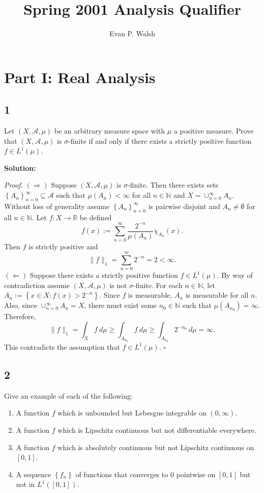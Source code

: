 \documentclass[12pt]{article}
\title{Spring 2001 Analysis Qualifier}
\author{Evan P. Walsh}
\newcounter{ProofCounter}
\newenvironment{Proof}{\stepcounter{ProofCounter}\textit{Proof.}}{\hfill$\square$}
\begin{document}

\section*{Part I: Real Analysis}

\subsection*{1}
Let $(X, \mathcal{A}, \mu)$ be an arbitrary measure space with $\mu$ a positive measure. Prove that $(X, \mathcal{A}, \mu)$ is $\sigma$-finite if and
only if there exists a strictly positive function $f \in L^{1}(\mu)$.

{\bf Solution:}

\begin{Proof}
$(\Rightarrow)$ Suppose $(X, \mathcal{A}, \mu)$ is $\sigma$-finite. Then there exists sets $\left\{ A_{n} \right\}_{n=0}^{\infty} \subseteq
\mathcal{A}$ such that $\mu(A_{n}) < \infty$ for all $n \in \mathbb{N}$ and $X = \cup_{n=0}^{\infty}A_{n}$. Without loss of generality assume 
$\left\{ A_{n} \right\}_{n=0}^{\infty}$ is pairwise disjoint and $A_{n} \neq \emptyset$ for all $n \in \mathbb{N}$. Let $f : X \rightarrow \mathbb{R}$
be defined 
\[ f(x) := \sum_{n=0}^{\infty}\frac{2^{-n}}{\mu(A_{n})}\chi_{A_{n}}(x). \] 
Then $f$ is strictly positive and 
\[ \|f\|_{1} = \sum_{n=0}^{\infty}2^{-n} = 2 < \infty. \]
$(\Leftarrow)$ Suppose there exists a strictly positive function $f \in L^{1}(\mu)$. By way of contradiction assume $(X, \mathcal{A}, \mu)$ is not
$\sigma$-finite. For each $n \in \mathbb{N}$, let $A_{n} := \left\{ x \in X : f(x) > 2^{-n} \right\}$. Since $f$ is measurable, $A_{n}$ is measurable
for all $n$. Also, since $\cup_{n=0}^{\infty}A_{n} = X$, there must exist some $n_{0} \in \mathbb{N}$ such that $\mu(A_{n_{0}}) = \infty$. Therefore,
\[ \|f\|_{1} = \int_{X} f\ d\mu \geq \int_{A_{n_{0}}}f \ d\mu \geq \int_{A_{n_{0}}} 2^{-n_{0}} \ d\mu = \infty. \]
This contradicts the assumption that $f \in L^{1}(\mu)$.
\end{Proof}

\subsection*{2}
Give an example of each of the following:
\begin{enumerate}[label=(\alph*)]
\item A function $f$ which is unbounded but Lebesgue integrable on $(0,\infty)$.
\item A function $f$ which is Lipschitz continuous but not differentiable everywhere.
\item A function $f$ which is absolutely continuous but not Lipschitz continuous on $[0,1]$.
\item A sequence $\left\{ f_{n} \right\}$ of functions that converges to $0$ pointwise on $[0,1]$ but not in $L^{1}([0,1])$.
\end{enumerate}
\end{document}
